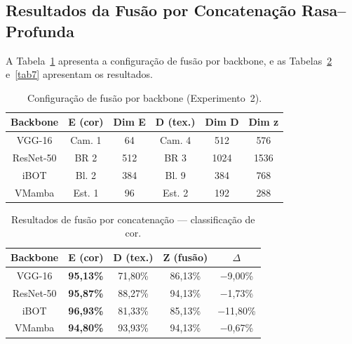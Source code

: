 \documentclass[letterpaper, 10 pt, conference]{ieeeconf}
\begin{document}
\subsection{Resultados da Fusão por Concatenação Rasa--Profunda}

A Tabela~\ref{tab5} apresenta a configuração de fusão por backbone, e as
Tabelas~\ref{tab6} e~\ref{tab7} apresentam os resultados.

\begin{table}[htbp]
\caption{Configuração de fusão por backbone (Experimento~2).}
\begin{center}
\begin{tabular}{c|c|c|c|c|c}
\hline
\textbf{Backbone} & \textbf{E (cor)} & \textbf{Dim E}
                  & \textbf{D (tex.)} & \textbf{Dim D} & \textbf{Dim z} \\
\hline
VGG-16    & Cam. 1 & 64  & Cam. 4  & 512  & 576  \\
ResNet-50 & BR 2   & 512 & BR 3    & 1024 & 1536 \\
iBOT      & Bl. 2  & 384 & Bl. 9   & 384  & 768  \\
VMamba    & Est. 1 & 96  & Est. 2  & 192  & 288  \\
\hline
\end{tabular}
\label{tab5}
\end{center}
\end{table}

\begin{table}[htbp]
\caption{Resultados de fusão por concatenação --- classificação de cor.}
\begin{center}
\begin{tabular}{c|c|c|c|c}
\hline
\textbf{Backbone} & \textbf{E (cor)} & \textbf{D (tex.)}
                  & \textbf{Z (fusão)} & \textbf{$\Delta$} \\
\hline
VGG-16    & \textbf{95,13\%} & 71,80\% & 86,13\% & $-$9,00\%  \\
ResNet-50 & \textbf{95,87\%} & 88,27\% & 94,13\% & $-$1,73\%  \\
iBOT      & \textbf{96,93\%} & 81,33\% & 85,13\% & $-$11,80\% \\
VMamba    & \textbf{94,80\%} & 93,93\% & 94,13\% & $-$0,67\%  \\
\hline
\end{tabular}
\label{tab6}
\end{center}
\end{table}
\end{document}
